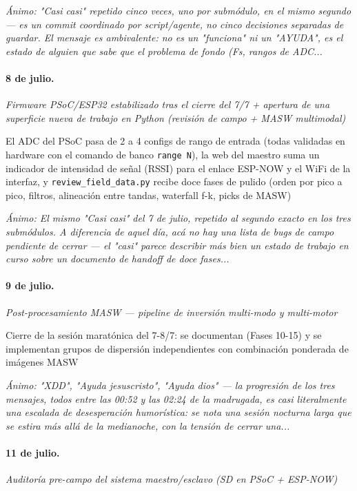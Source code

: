 {\footnotesize\itshape \'Animo: "Casi casi" repetido cinco veces, uno por submódulo, en el mismo segundo --- es un commit coordinado por script/agente, no cinco decisiones separadas de guardar. El mensaje es ambivalente: no es un "funciona" ni un "AYUDA", es el estado de alguien que sabe que el problema de fondo (Fs, rangos de ADC...}

\paragraph{8 de julio.}
\emph{Firmware PSoC/ESP32 estabilizado tras el cierre del 7/7 + apertura de una superficie nueva de trabajo en Python (revisión de campo + MASW multimodal)}

El ADC del PSoC pasa de 2 a 4 configs de rango de entrada (todas validadas en hardware con el comando de banco \texttt{range N}), la web del maestro suma un indicador de intensidad de señal (RSSI) para el enlace ESP-NOW y el WiFi de la interfaz, y \texttt{review\_field\_data.py} recibe doce fases de pulido (orden por pico a pico, filtros, alineación entre tandas, waterfall f-k, picks de MASW)

{\footnotesize\itshape \'Animo: El mismo "Casi casi" del 7 de julio, repetido al segundo exacto en los tres submódulos. A diferencia de aquel día, acá no hay una lista de bugs de campo pendiente de cerrar --- el "casi" parece describir más bien un estado de trabajo en curso sobre un documento de handoff de doce fases...}

\paragraph{9 de julio.}
\emph{Post-procesamiento MASW --- pipeline de inversión multi-modo y multi-motor}

Cierre de la sesión maratónica del 7-8/7: se documentan (Fases 10-15) y se implementan grupos de dispersión independientes con combinación ponderada de imágenes MASW

{\footnotesize\itshape \'Animo: "XDD", "Ayuda jesuscristo", "Ayuda dios" --- la progresión de los tres mensajes, todos entre las 00:52 y las 02:24 de la madrugada, es casi literalmente una escalada de desesperación humorística: se nota una sesión nocturna larga que se estira más allá de la medianoche, con la tensión de cerrar una...}

\paragraph{11 de julio.}
\emph{Auditoría pre-campo del sistema maestro/esclavo (SD en PSoC + ESP-NOW)}

